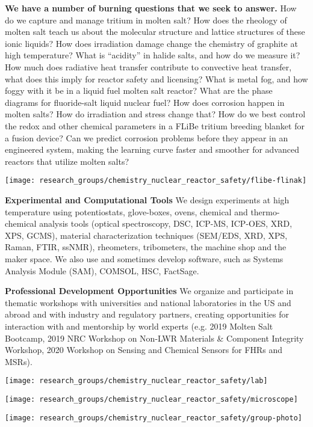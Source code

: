 \textbf{We have a number of burning questions that we seek to answer.}
How do we capture and manage tritium in molten salt?
How does the rheology of molten salt teach us about the molecular structure and lattice structures of these ionic liquids?
How does irradiation damage change the chemistry of graphite at high temperature?
What is “acidity” in halide salts, and how do we measure it?
How much does radiative heat transfer contribute to convective heat transfer, what does this imply for reactor safety and licensing?
What is metal fog, and how foggy with it be in a liquid fuel molten salt reactor?
What are the phase diagrams for fluoride-salt liquid nuclear fuel? How does corrosion happen in molten salts? How do irradiation and stress change that?
How do we best control the redox and other chemical parameters in a FLiBe tritium breeding blanket for a fusion device?
Can we predict corrosion problems before they appear in an engineered system, making the learning curve faster and smoother for advanced reactors that utilize molten salts?

\vspace{0.75cm}
\begin{minipage}{\textwidth}
	\texttt{[image: research\_groups/chemistry\_nuclear\_reactor\_safety/flibe-flinak]}
\end{minipage}
\vspace{0.75cm}

\textbf{Experimental and Computational Tools}
We design experiments at high temperature using potentiostats, glove-boxes, ovens, chemical and thermo-chemical analysis tools (optical spectroscopy, DSC, ICP-MS, ICP-OES, XRD, XPS, GCMS), material characterization techniques (SEM/EDS, XRD, XPS, Raman, FTIR, ssNMR), rheometers, tribometers, the machine shop and the maker space.
We also use and sometimes develop software, such as Systems Analysis Module (SAM), COMSOL, HSC, FactSage.

\textbf{Professional Development Opportunities}
We organize and participate in thematic workshops with universities and national laboratories in the US and abroad and with industry and regulatory partners, creating opportunities for interaction with and mentorship by world experts (e.g. 2019 Molten Salt Bootcamp, 2019 NRC Workshop on Non-LWR Materials \& Component Integrity Workshop, 2020 Workshop on Sensing and Chemical Sensors for FHRs and MSRs).  


\vspace{0.5cm}
\begin{minipage}{0.5\textwidth}
	\texttt{[image: research\_groups/chemistry\_nuclear\_reactor\_safety/lab]}
\end{minipage}
\begin{minipage}{0.5\textwidth}
	\texttt{[image: research\_groups/chemistry\_nuclear\_reactor\_safety/microscope]}
\end{minipage}
\begin{minipage}{\textwidth}
	\texttt{[image: research\_groups/chemistry\_nuclear\_reactor\_safety/group-photo]}
\end{minipage}

